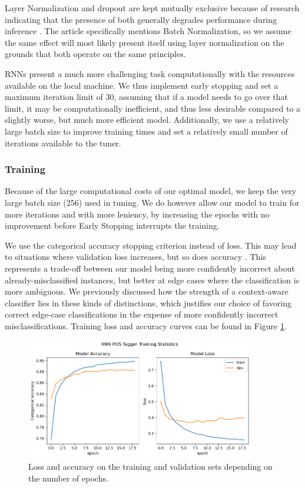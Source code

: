\documentclass[10pt, a4paper]{article}
\begin{document}
	Layer Normalization and dropout are kept mutually exclusive because of research indicating that the presence of both generally degrades performance during inference \cite{dropout-norm}. The article specifically mentions Batch Normalization, so we assume the same effect will most likely present itself using layer normalization on the grounds that both operate on the same principles.
	
	RNNs present a much more challenging task computationally with the resources available on the local machine. We thus implement early stopping and set a maximum iteration limit of $30$, assuming that if a model needs to go over that limit, it may be computationally inefficient, and thus less desirable compared to a slightly worse, but much more efficient model. Additionally, we use a relatively large batch size to improve training times and set a relatively small number of iterations available to the tuner.
	
	
	\subsubsection{Training}
	
	Because of the large computational costs of our optimal model, we keep the very large batch size (256) used in tuning. We do however allow our model to train for more iterations and with more leniency, by increasing the epochs with no improvement before Early Stopping interrupts the training.
	
	We use the categorical accuracy stopping criterion instead of loss. This may lead to situations where validation loss increases, but so does accuracy \cite{loss-accuracy}. This represents a trade-off between our model being more confidently incorrect about already-misclassified instances, but better at edge cases where the classification is more ambiguous. We previously discussed how the strength of a context-aware classifier lies in these kinds of distinctions, which justifies our choice of favoring correct edge-case classifications in the expense of more confidently incorrect misclassifications. Training loss and accuracy curves can be found in Figure \ref{fig::ex_3_fit}.
	
	\begin{figure}
		\centering
		\includegraphics[width=10cm]{"ex_3_fit.png"}
		\caption{Loss and accuracy on the training and validation sets depending on the number of epochs.}
		\label{fig::ex_3_fit}
	\end{figure}
	
\end{document}
